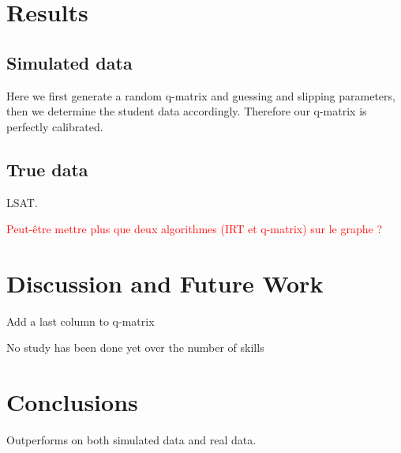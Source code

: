 \documentclass{sig-alternate}
\newcommand\alert[1]{\textcolor{red}{#1}}
\begin{document}
\section{Results}

\subsection{Simulated data}

Here we first generate a random q-matrix and guessing and slipping parameters, then we determine the student data accordingly. Therefore our q-matrix is perfectly calibrated.

\subsection{True data}

LSAT.

\alert{Peut-être mettre plus que deux algorithmes (IRT et q-matrix) sur le graphe ?}

\section{Discussion and Future Work}

Add a last column to q-matrix

No study has been done yet over the number of skills

\section{Conclusions}

Outperforms on both simulated data and real data.

%


%
%

\end{document}
